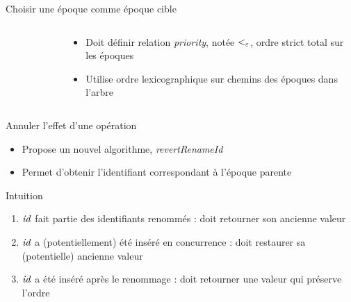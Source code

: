 \begin{frame}{Choisir une époque comme époque cible}
\begin{columns}
\begin{column}{0.3 \textwidth}
\begin{figure}
{
        }
      \end{figure}
    \end{column}
    \begin{column}{0.7 \textwidth}
      \begin{itemize}
        \item Doit définir relation \emph{priority}, notée $<_{\varepsilon}$, ordre strict total sur les époques
        \item Utilise ordre lexicographique sur chemins des époques dans l'arbre
      \end{itemize}
    \end{column}
  \end{columns}
\end{frame}

\begin{frame}{Annuler l'effet d'une opération \ren}
  \begin{itemize}
    \item Propose un nouvel algorithme, \emph{revertRenameId}
    \item Permet d'obtenir l'identifiant correspondant à l'époque parente
  \end{itemize}
  \begin{block}{Intuition}
    \begin{enumerate}
      \item $\mathit{id}$ fait partie des identifiants renommés : doit retourner son ancienne valeur
      \item $\mathit{id}$ a (potentiellement) été inséré en concurrence : doit restaurer sa (potentielle) ancienne valeur
      \item $\mathit{id}$ a été inséré après le renommage : doit retourner une valeur qui préserve l'ordre
    \end{enumerate}
  \end{block}
\end{frame}

